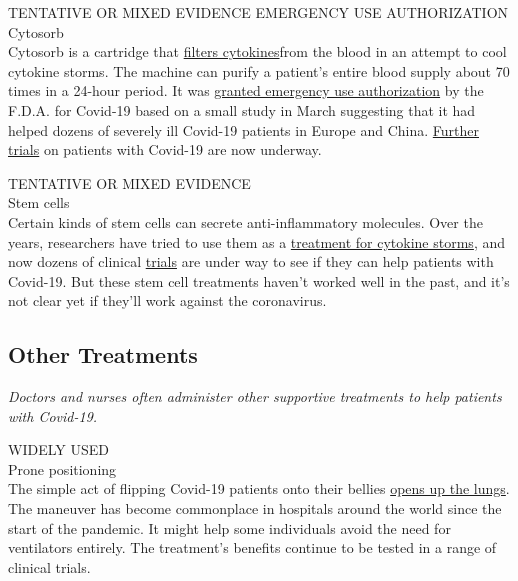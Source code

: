 TENTATIVE OR MIXED EVIDENCE EMERGENCY USE AUTHORIZATION\\
Cytosorb\\
Cytosorb is a cartridge that
\href{https://www.nytimes.com/2020/06/11/health/coronavirus-cytokine-storm.html}{filters
cytokines}from the blood in an attempt to cool cytokine storms. The
machine can purify a patient's entire blood supply about 70 times in a
24-hour period. It was
\href{https://www.nhlbi.nih.gov/news/2020/novel-blood-filter-approved-fda-emergency-treatment-covid-19}{granted
emergency use authorization} by the F.D.A. for Covid-19 based on a small
study in March suggesting that it had helped dozens of severely ill
Covid-19 patients in Europe and China.
\href{https://clinicaltrials.gov/ct2/results?cond=covid-19\&term=cytosorb\&cntry=\&state=\&city=\&dist=}{Further
trials} on patients with Covid-19 are now underway.

TENTATIVE OR MIXED EVIDENCE\\
Stem cells\\
Certain kinds of stem cells can secrete anti-inflammatory molecules.
Over the years, researchers have tried to use them as a
\href{https://celltrials.org/news/role-msc-treat-coronavirus-pneumonia-and-ards-part-1-is-emperor-wearing-clothes}{treatment
for cytokine storms}, and now dozens of clinical
\href{https://clinicaltrials.gov/ct2/results?term=stem+cell\&cond=COVID-19\&age_v=\&gndr=\&type=\&rslt=\&phase=0\&phase=1\&phase=2\&phase=3\&Search=Apply}{trials}
are under way to see if they can help patients with Covid-19. But these
stem cell treatments haven't worked well in the past, and it's not clear
yet if they'll work against the coronavirus.

\hypertarget{other-treatments}{%
\subsection{Other Treatments}\label{other-treatments}}

\emph{Doctors and nurses often administer other supportive treatments to
help patients with Covid-19.}

WIDELY USED\\
Prone positioning\\
The simple act of flipping Covid-19 patients onto their bellies
\href{https://www.nytimes.com/2020/05/13/health/coronavirus-proning-lungs.html}{opens
up the lungs}. The maneuver has become commonplace in hospitals around
the world since the start of the pandemic. It might help some
individuals avoid the need for ventilators entirely. The treatment's
benefits continue to be tested in a range of clinical trials.

